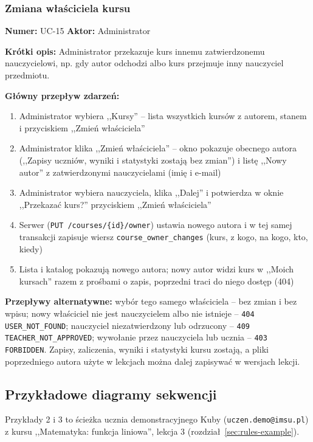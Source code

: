 \subsubsection{Zmiana właściciela kursu}
\textbf{Numer:} UC-15 \quad \textbf{Aktor:} Administrator

\textbf{Krótki opis:} Administrator przekazuje kurs innemu zatwierdzonemu nauczycielowi, np. gdy autor odchodzi albo kurs przejmuje inny nauczyciel przedmiotu.

\textbf{Główny przepływ zdarzeń:}
\begin{enumerate}[leftmargin=*]
    \item Administrator wybiera ,,Kursy'' -- lista wszystkich kursów z autorem, stanem i przyciskiem ,,Zmień właściciela''
    \item Administrator klika ,,Zmień właściciela'' -- okno pokazuje obecnego autora (,,Zapisy uczniów, wyniki i statystyki zostają bez zmian'') i listę ,,Nowy autor'' z zatwierdzonymi nauczycielami (imię i e-mail)
    \item Administrator wybiera nauczyciela, klika ,,Dalej'' i potwierdza w oknie ,,Przekazać kurs?'' przyciskiem ,,Zmień właściciela''
    \item Serwer (\texttt{PUT /courses/\{id\}/owner}) ustawia nowego autora i w tej samej transakcji zapisuje wiersz \texttt{course\_owner\_changes} (kurs, z kogo, na kogo, kto, kiedy)
    \item Lista i katalog pokazują nowego autora; nowy autor widzi kurs w ,,Moich kursach'' razem z prośbami o zapis, poprzedni traci do niego dostęp (404)
\end{enumerate}

\textbf{Przepływy alternatywne:} wybór tego samego właściciela -- bez zmian i bez wpisu; nowy właściciel nie jest nauczycielem albo nie istnieje -- \texttt{404 USER\_NOT\_FOUND}; nauczyciel niezatwierdzony lub odrzucony -- \texttt{409 TEACHER\_NOT\_APPROVED}; wywołanie przez nauczyciela lub ucznia -- \texttt{403 FORBIDDEN}. Zapisy, zaliczenia, wyniki i statystyki kursu zostają, a pliki poprzedniego autora użyte w lekcjach można dalej zapisywać w wersjach lekcji.

\subsection{Przykładowe diagramy sekwencji}

Przykłady 2 i 3 to ścieżka ucznia demonstracyjnego Kuby (\texttt{uczen.demo@imsu.pl}) z kursu ,,Matematyka: funkcja liniowa'', lekcja 3 (rozdział~\ref{sec:rules-example}).

